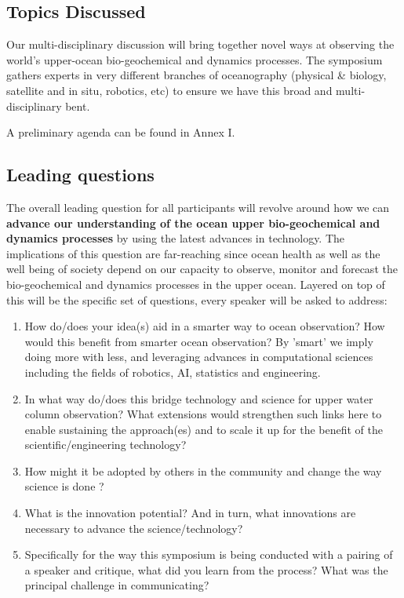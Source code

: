 \subsection{Topics Discussed}

Our multi-disciplinary discussion will bring together novel ways at
observing the world’s upper-ocean bio-geochemical and dynamics
processes. The symposium gathers experts in very different branches of
oceanography (physical \& biology, satellite and in situ, robotics, etc)
to ensure we have this broad and multi-disciplinary bent.

A preliminary agenda can be found in Annex I.

\subsection{Leading questions}

The overall leading question for all participants will revolve around
how we can \textbf{advance our understanding of the ocean upper
  bio-geochemical and dynamics processes} by using the latest advances
in technology. The implications of this question are far-reaching since
ocean health as well as the well being of society depend on our capacity
to observe, monitor and forecast the bio-geochemical and dynamics
processes in the upper ocean. Layered on top of this will be the
specific set of questions, every speaker will be asked to address:

\begin{enumerate}

\item How do/does your idea(s) aid in a smarter way to ocean
  observation? How would this benefit from smarter ocean observation? By
  'smart' we imply doing more with less, and leveraging advances in
  computational sciences including the fields of robotics, AI,
  statistics and engineering.

\item In what way do/does this bridge technology and science for upper
  water column observation? What extensions would strengthen such links
  here to enable sustaining the approach(es) and to scale it up for the
  benefit of the scientific/engineering technology?

\item How might it be adopted by others in the community and change the
  way science is done ?

\item What is the innovation potential? And in turn, what innovations
  are necessary to advance the science/technology?

\item Specifically for the way this symposium is being conducted with a
  pairing of a speaker and critique, what did you learn from the
  process? What was the principal challenge in communicating?

\end{enumerate}


